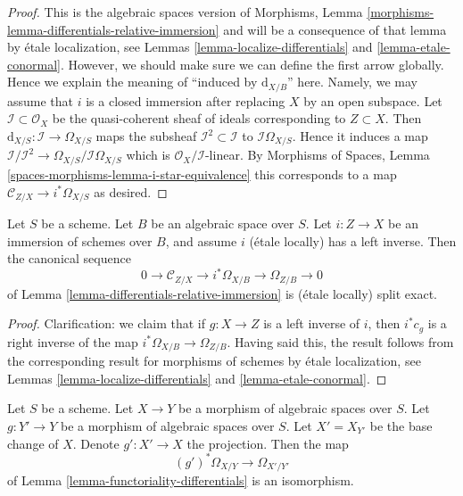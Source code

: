 \begin{proof}
This is the algebraic spaces version of
Morphisms, Lemma \ref{morphisms-lemma-differentials-relative-immersion}
and will be a consequence of that lemma by
\'etale localization, see
Lemmas \ref{lemma-localize-differentials} and
\ref{lemma-etale-conormal}.
However, we should make sure we can define the first arrow globally.
Hence we explain the meaning of ``induced by $\text{d}_{X/B}$'' here.
Namely, we may assume that $i$ is a closed immersion after replacing $X$
by an open subspace. Let $\mathcal{I} \subset \mathcal{O}_X$
be the quasi-coherent sheaf of ideals corresponding to $Z \subset X$.
Then $\text{d}_{X/S} : \mathcal{I} \to \Omega_{X/S}$
maps the subsheaf $\mathcal{I}^2 \subset \mathcal{I}$ to
$\mathcal{I}\Omega_{X/S}$. Hence it induces a map
$\mathcal{I}/\mathcal{I}^2 \to \Omega_{X/S}/\mathcal{I}\Omega_{X/S}$
which is $\mathcal{O}_X/\mathcal{I}$-linear.
By
Morphisms of Spaces, Lemma \ref{spaces-morphisms-lemma-i-star-equivalence}
this corresponds to a map $\mathcal{C}_{Z/X} \to i^*\Omega_{X/S}$ as desired.
\end{proof}

\begin{lemma}
\label{lemma-differentials-relative-immersion-section}
Let $S$ be a scheme. Let $B$ be an algebraic space over $S$.
Let $i : Z \to X$ be an immersion of schemes over $B$, and
assume $i$ (\'etale locally) has a left inverse. Then the canonical
sequence
$$
0 \to \mathcal{C}_{Z/X} \to i^*\Omega_{X/B} \to \Omega_{Z/B} \to 0
$$
of
Lemma \ref{lemma-differentials-relative-immersion}
is (\'etale locally) split exact.
\end{lemma}

\begin{proof}
Clarification: we claim that if $g : X \to Z$ is a left inverse of $i$,
then $i^*c_g$ is a right inverse of the map
$i^*\Omega_{X/B} \to \Omega_{Z/B}$.
Having said this, the result follows from the corresponding result for
morphisms of schemes by \'etale localization, see
Lemmas \ref{lemma-localize-differentials} and
\ref{lemma-etale-conormal}.
\end{proof}

\begin{lemma}
\label{lemma-base-change-differentials}
Let $S$ be a scheme.
Let $X \to Y$ be a morphism of algebraic spaces over $S$.
Let $g : Y' \to Y$ be a morphism of algebraic spaces over $S$.
Let $X' = X_{Y'}$ be the base change of $X$.
Denote $g' : X' \to X$ the projection.
Then the map
$$
(g')^*\Omega_{X/Y} \to \Omega_{X'/Y'}
$$
of
Lemma \ref{lemma-functoriality-differentials}
is an isomorphism.
\end{lemma}

